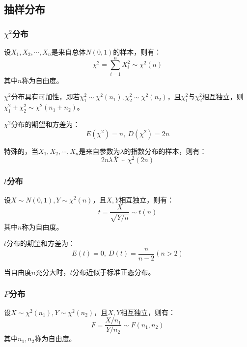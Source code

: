 \documentclass[a4paper,12pt]{ctexart}
\begin{document}
\subsection{抽样分布}

\subsubsection{$\chi^2$分布}

设$X_1,X_2,\cdots,X_n$是来自总体$N(0,1)$的样本，则有：
\begin{equation*}
	\chi^2 = \sum_{i=1}^nX_i^2 \sim \chi^2(n)
\end{equation*}
其中$n$称为自由度。

$\chi^2$分布具有可加性，即若$\chi_1^2 \sim \chi^2(n_1), \chi_2^2 \sim \chi^2(n_2)$，且$\chi_1^2$与$\chi_2^2$相互独立，则$\chi_1^2 + \chi_2^2 \sim \chi^2(n_1 + n_2)$。

$\chi^2$分布的期望和方差为：
\begin{equation*}
	E(\chi^2) = n,\ D(\chi^2) = 2n
\end{equation*}

特殊的，当$X_1,X_2,\cdots,X_n$是来自参数为$\lambda$的指数分布的样本，则有：
\begin{equation*}
	2n \lambda \overline{X} \sim \chi^2(2n)
\end{equation*}

\subsubsection{$t$分布}

设$X \sim N(0,1), Y \sim \chi^2(n)$，且$X,Y$相互独立，则有：
\begin{equation*}
	t = \frac{X}{\sqrt{Y/n}} \sim t(n)
\end{equation*}
其中$n$称为自由度。

$t$分布的期望和方差为：
\begin{equation*}
	E(t) = 0,\ D(t) = \frac{n}{n-2}(n > 2)
\end{equation*}

当自由度$n$充分大时，$t$分布近似于标准正态分布。

\subsubsection{$F$分布}

设$X \sim \chi^2(n_1), Y \sim \chi^2(n_2)$，且$X,Y$相互独立，则有：
\begin{equation*}
	F = \frac{X/n_1}{Y/n_2} \sim F(n_1,n_2)
\end{equation*}
其中$n_1,n_2$称为自由度。
\end{document}
